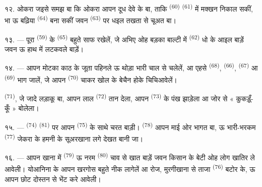 १२. ओकरा जइसे समझ बा कि ओकरा आपन दूध देवे के बा, ताकि
 \textsuperscript{(60)}  \textsuperscript{(61)}
में मक्खन निकाल सकीं, भा ऊ बढ़िया  \textsuperscript{(64)}
बना सकीं जवन  \textsuperscript{(63)} पर धइल तखता से चूअत बा।

१३. --- पूरा  \textsuperscript{(59)} के  \textsuperscript{(65)} बहुते साफ रखेलें, जे अभिए ओह बड़का बाल्टी
में  \textsuperscript{(62)} धो के आइल बाड़ें जवन ऊ
हाथ में लटकवले बाड़ें।

\VUsaut{3.0mm}
\VUsaut{3.0mm}

१४. --- आपन मोटका काठ के जूता पहिनले ऊ थोड़ा भारी चाल से चलेलें, आ
एहसे  \textsuperscript{(68)}, 
\textsuperscript{(66)},  \textsuperscript{(67)} आ
 \textsuperscript{(69)} भाग जालें, जे आपन 
\textsuperscript{(70)} चाकर खोल के बेचैन होके चिचिआवेलें।

 \textsuperscript{(71)}, जे जादे लड़ाकू बा, आपन लाल
 \textsuperscript{(72)} तान देला, आपन 
\textsuperscript{(73)} के पंख झाड़ेला आ जोर से « कुकड़ूँ-कूँ » बोलेला।

१५. ---  \textsuperscript{(74)}  \textsuperscript{(81)} पर आपन  \textsuperscript{(75)}
के साथे चरत बाड़ी।  \textsuperscript{(78)} आपन माई ओर
भागत बा, ऊ भारी-भरकम  \textsuperscript{(77)} जेकरा के हमनी
के सूअरखाना लगे देखत बानी जा।

१६. --- आपन खाना में  \textsuperscript{(79)} ऊ नरम
 \textsuperscript{(80)} चाव से खात बाड़ें जवन किसान के बेटी
ओह लोग खातिर ले आवेली। योआनिना के आपन खरगोस बहुते नीक लागेलें आ रोज,
मुरगीखाना से ताजा  \textsuperscript{(76)} बटोर के, ऊ आपन
छोट दोस्तन से भेंट करे आवेली।

